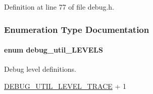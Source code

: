 Definition at line 77 of file debug.\-h.



\subsubsection{Enumeration Type Documentation}
\hypertarget{a00001_aa67647dffda81c4bf40a22606de434db}{
\paragraph[{debug\-\_\-util\-\_\-\-L\-E\-V\-E\-L\-S}]{\setlength{\rightskip}{0pt plus 5cm}enum {\bf debug\-\_\-util\-\_\-\-L\-E\-V\-E\-L\-S}}}\label{a00001_aa67647dffda81c4bf40a22606de434db}
Debug level definitions. 
\begin{DoxyCode}
\hyperlink{a00001_aa67647dffda81c4bf40a22606de434dba8cfdc9de8fc139c9bcc40ef2324f1547}{DEBUG\_UTIL\_LEVEL\_TRACE} + 1
\end{DoxyCode}
